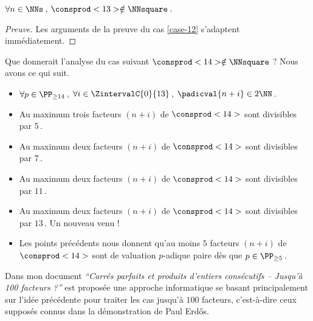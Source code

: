 \begin{fact} \label{case-13}
	 $\forall n \in \NNs$\,, $\consprod<13> \notin \NNsquare$\,.
\end{fact}




\begin{proof}[Preuve]%
    Les arguments de la preuve du cas \ref{case-12} s'adaptent immédiatement.
\end{proof}




\begin{remark}
	Que donnerait l'analyse du cas suivant $\consprod<14> \notin \NNsquare$ ?
	Nous avons ce qui suit.
    \begin{itemize}
		\item $\forall p \in \PP_{\geq 14}$\,, 
    $\forall i \in \ZintervalC{0}{13}$\,, 
    $\padicval{n + i} \in 2 \NN$\,.
		
		\item Au maximum trois facteurs $(n + i)$ de $\consprod<14>$ sont divisibles par $5$\,.

		\item Au maximum deux facteurs $(n + i)$ de $\consprod<14>$ sont divisibles par $7$\,.

		\item Au maximum deux facteurs $(n + i)$ de $\consprod<14>$ sont divisibles par $11$\,.

		\item Au maximum deux facteurs $(n + i)$ de $\consprod<14>$ sont divisibles par $13$\,. Un nouveau venu !

		\item Les points précédents nous donnent qu'au moins $5$ facteurs $(n + i)$ de $\consprod<14>$ sont de valu\-ation $p$-adique paire dès que $p \in \PP_{\geq 5}$\,.
    \end{itemize}
    
    Dans mon document \emph{\enquote{Carrés parfaits et produits d'entiers consécutifs -- Jusqu'à 100 facteurs ?}} est proposée une approche informatique se basant principalement sur l'idée précédente pour traiter les cas jusqu'à $100$ facteurs, c'est-à-dire ceux supposés connus dans la démonstration de Paul Erdős.
\end{remark}
